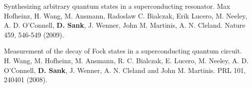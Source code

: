 \documentclass[margin=2cm,line]{res}
\begin{document}
\begin{resume}
\begin{list3}
\item Synthesizing arbitrary quantum states in a superconducting resonator. Max Hofheinz, H. Wang, M. Ansmann, Radoslaw C. Bialczak, Erik Lucero, M. Neeley, A. D. O'Connell, \textbf{D. Sank}, J. Wenner, John M. Martinis, A. N. Cleland. Nature 459, 546-549 (2009). \\

\item Measurement of the decay of Fock states in a superconducting quantum circuit. H. Wang, M. Hofheinz, M. Ansmann, R. C. Bialczak, E. Lucero, M. Neeley, A. D. O'Connell, \textbf{D. Sank}, J. Wenner, A. N. Cleland and John M. Martinis. PRL 101, 240401 (2008).
\\
\end{list3}


\end{resume}
\end{document}
